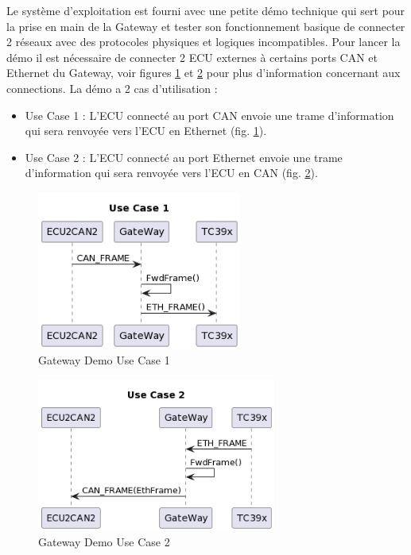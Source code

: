 Le système d'exploitation est fourni avec une petite démo technique qui sert pour la prise en main de la Gateway et tester son fonctionnement basique de connecter 2 réseaux avec des protocoles physiques et logiques incompatibles. Pour lancer la démo il est nécessaire de connecter 2 ECU externes \`a certains ports CAN et Ethernet du Gateway, voir figures \ref{fig:gw-demo-uc1} et \ref{fig:gw-demo-uc2} pour plus d'information concernant aux connections. La démo a 2 cas d'utilisation : 

\begin{itemize} 

    \item Use Case 1 : L'ECU connect\'e au port CAN envoie une trame d'information qui sera renvoyée vers l'ECU en Ethernet (fig. \ref{fig:gw-demo-uc1}). 

    \item Use Case 2 : L'ECU connect\'e au port Ethernet envoie une trame d'information qui sera renvoyée vers l'ECU en CAN (fig. \ref{fig:gw-demo-uc2}). 

\end{itemize} 

\begin{figure}[!htb]
 \centering
 \includegraphics[width=0.6\textwidth]{img/GWUseCase1.png}
 \caption{Gateway Demo Use Case 1}
 \label{fig:gw-demo-uc1}
\end{figure}

\begin{figure}[!htb]
 \centering
 \includegraphics[width=0.7\textwidth]{img/GWUseCase2.png}
 \caption{Gateway Demo Use Case 2}
 \label{fig:gw-demo-uc2}
\end{figure}

